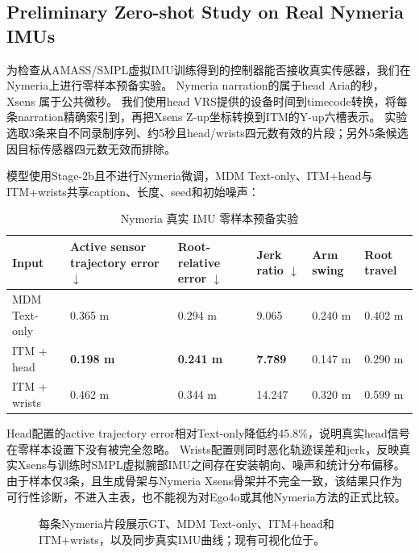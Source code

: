 \subsection{Preliminary Zero-shot Study on Real Nymeria IMUs}

为检查从AMASS/SMPL虚拟IMU训练得到的控制器能否接收真实传感器，我们在Nymeria上进行零样本预备实验。
Nymeria narration的\texttt{}属于head Aria的\texttt{}秒，Xsens \texttt{}属于公共\texttt{}微秒。
我们使用head VRS提供的设备时间到timecode转换，将每条narration精确索引到\texttt{}，再把Xsens Z-up坐标转换到ITM的Y-up六槽表示。
实验选取3条来自不同录制序列、约5秒且head/wrists四元数有效的片段；另外5条候选因目标传感器四元数无效而排除。

模型使用Stage-2b且不进行Nymeria微调，MDM Text-only、ITM+head与ITM+wrists共享caption、长度、seed和初始噪声：

\begin{table}[t]
\centering
\caption{Nymeria 真实 IMU 零样本预备实验}
\label{tab:result-16}
\footnotesize
\setlength{\tabcolsep}{3pt}
\renewcommand{\arraystretch}{1.15}
\begin{tabularx}{\linewidth}{LLLLLL}
\toprule
Input & Active sensor trajectory error \ensuremath{\downarrow} & Root-relative error \ensuremath{\downarrow} & Jerk ratio \ensuremath{\downarrow} & Arm swing & Root travel \\
\midrule
MDM Text-only & 0.365 m & 0.294 m & 9.065 & 0.240 m & 0.402 m \\
ITM + head & \textbf{0.198 m} & \textbf{0.241 m} & \textbf{7.789} & 0.147 m & 0.290 m \\
ITM + wrists & 0.462 m & 0.344 m & 14.247 & 0.320 m & 0.599 m \\
\bottomrule
\end{tabularx}
\end{table}


Head配置的active trajectory error相对Text-only降低约45.8\%，说明真实head信号在零样本设置下没有被完全忽略。
Wrists配置则同时恶化轨迹误差和jerk，反映真实Xsens与训练时SMPL虚拟腕部IMU之间存在安装朝向、噪声和统计分布偏移。
由于样本仅3条，且生成骨架与Nymeria Xsens骨架并不完全一致，该结果只作为可行性诊断，不进入主表，也不能视为对Ego4o或其他Nymeria方法的正式比较。

\begin{figure}[t]
\centering
{}
\caption{每条Nymeria片段展示GT、MDM Text-only、ITM+head和ITM+wrists，以及同步真实IMU曲线；现有可视化位于\texttt{\protect{}}。}
\label{fig:qualitative-4}
\end{figure}
